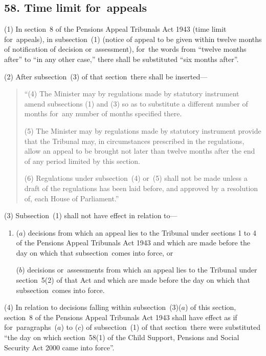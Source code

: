 \documentclass[12pt,a4paper]{article}
\begin{document}

\subsection{58. Time limit for~appeals}

(1) In section~8 of the Pensions Appeal Tribunals Act 1943 (time limit for~appeals), in subsection~(1)  (notice of appeal to be given within twelve months of notification of decision or~assessment), for~the words from “twelve months after” to “in any other case,” there shall be substituted “six months after”.

(2) After subsection~(3)  of that section~there shall be inserted—
\begin{quotation}
“(4) The Minister may by regulations made by statutory instrument amend subsections (1)  and (3)  so as to substitute a different number of months for~any number of months specified there.

(5) The Minister may by regulations made by statutory instrument provide that the Tribunal may, in circumstances prescribed in the regulations, allow an appeal to be brought not later than twelve months after the end of any period limited by this section.

(6) Regulations under subsection~(4)  or~(5)  shall not be made unless a draft of the regulations has been laid before, and approved by a resolution of, each House of Parliament.”
\end{quotation}

(3) Subsection~(1)  shall not have effect in relation to—
\begin{enumerate}\item[]
($a$) decisions from which an appeal lies to the Tribunal under sections 1 to 4 of the Pensions Appeal Tribunals Act 1943 and which are made before the day on which that subsection~comes into force, or

($b$) decisions or~assessments from which an appeal lies to the Tribunal under section~5(2)  of that Act and which are made before the day on which that subsection~comes into force.
\end{enumerate}

(4) In relation to decisions falling within subsection~(3)($a$)  of this section, section~8 of the Pensions Appeal Tribunals Act 1943 shall have effect as if for~paragraphs~($a$)  to ($c$)  of subsection~(1)  of that section~there were substituted “the day on which section~58(1)  of the Child Support, Pensions and Social Security Act 2000 came into force”.
\end{document}
